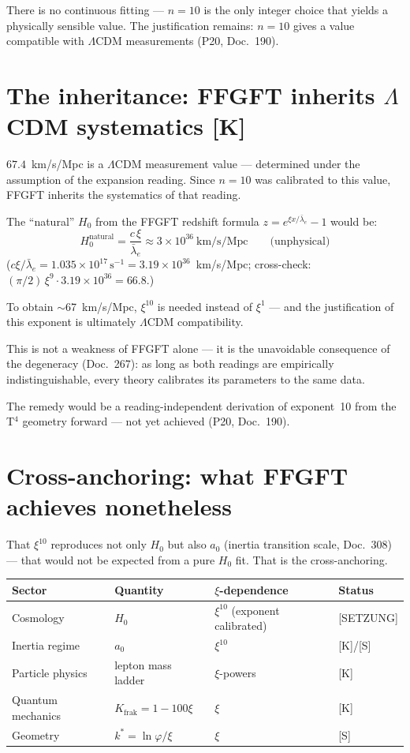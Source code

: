 There is no continuous fitting — $n=10$ is the only integer choice that
yields a physically sensible value. The justification remains: $n=10$
gives a value compatible with $\Lambda$CDM measurements (P20, Doc.~190).

\section{The inheritance: FFGFT inherits $\Lambda$CDM systematics [K]}

$67.4$~km/s/Mpc is a $\Lambda$CDM measurement value — determined under
the assumption of the expansion reading. Since $n=10$ was calibrated to
this value, FFGFT inherits the systematics of that reading.

The ``natural'' $H_0$ from the FFGFT redshift formula
$z = e^{\xi x/\bar\lambda_e} - 1$ would be:
\[
  H_0^\text{natural} = \frac{c\,\xi}{\bar\lambda_e}
  \approx 3\times10^{36}~\text{km/s/Mpc}
  \qquad\text{(unphysical)}
\]
($c\xi/\bar\lambda_e = 1.035\times10^{17}\,\mathrm{s}^{-1} = 3.19\times10^{36}$~km/s/Mpc; cross-check: $(\pi/2)\,\xi^9\cdot3.19\times10^{36} = 66.8$.)

To obtain $\sim$67~km/s/Mpc, $\xi^{10}$ is needed instead of $\xi^1$
— and the justification of this exponent is ultimately
$\Lambda$CDM compatibility.

This is not a weakness of FFGFT alone — it is the unavoidable
consequence of the degeneracy (Doc.~267): as long as both readings are
empirically indistinguishable, every theory calibrates its parameters
to the same data.

The remedy would be a reading-independent derivation of exponent~10
from the T$^4$ geometry forward — not yet achieved (P20, Doc.~190).

\section{Cross-anchoring: what FFGFT achieves nonetheless}

That $\xi^{10}$ reproduces not only $H_0$ but also $a_0$ (inertia
transition scale, Doc.~308) — that would not be expected from a pure
$H_0$ fit. That is the cross-anchoring.

\begin{center}
\begin{tabular}{llll}
\toprule
Sector & Quantity & $\xi$-dependence & Status \\
\midrule
Cosmology & $H_0$ & $\xi^{10}$ (exponent calibrated) & [SETZUNG] \\
Inertia regime & $a_0$ & $\xi^{10}$ & [K]/[S] \\
Particle physics & lepton mass ladder & $\xi$-powers & [K] \\
Quantum mechanics & $K_\text{frak} = 1-100\xi$ & $\xi$ & [K] \\
Geometry & $k^* = \ln\varphi/\xi$ & $\xi$ & [S] \\
\bottomrule
\end{tabular}
\end{center}

